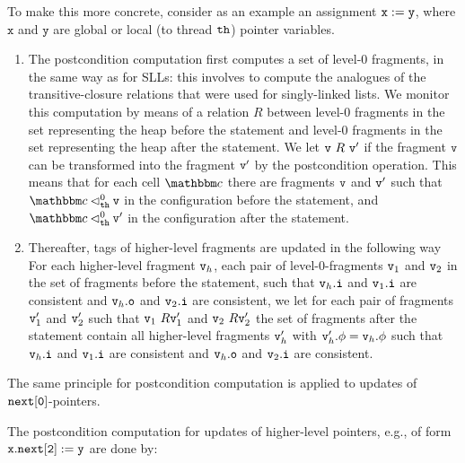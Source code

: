 To make this more concrete, consider as an example an assignment
${\tt x := y}$, where $\mathtt{x}$ and $\mathtt{y}$ are global or local
(to thread ${\tt th}$) pointer variables.
\begin{enumerate}
  \item
The postcondition computation first computes a set of level-$0$ fragments,
in the same way as for SLLs: this involves to compute
the analogues of the transitive-closure relations that were used
for singly-linked lists. We monitor this computation by means of a relation
$R$ between level-$0$ fragments  in the set representing the heap before the
statement and level-$0$ fragments in the set representing the heap after the
statement. We let $\mathtt{v} \ R \ \mathtt{v}'$ if the fragment $\mathtt{v}$ can be
transformed into the fragment $\mathtt{v}'$ by the postcondition operation.
This means that for each cell $\cell$ there are fragments $\mathtt{v}$ and $\mathtt{v}'$
such that $\cell \satslfrag{\thread}{0} \frag$ in the configuration before
the statement, and $\cell \satslfrag{\thread}{0} \frag'$ in the configuration
after the statement.
\item
  Thereafter, tags of higher-level fragments are updated in the following way
  For each higher-level fragment $\mathtt{v}_h$, each pair of
  level-$0$-fragments $\mathtt{v}_1$ and $\mathtt{v}_2$ in the set of fragments
  before the statement, such that
  $\mathtt{v}_h.\mathtt{i}$ and $\mathtt{v}_1.\mathtt{i}$ are consistent and
  $\mathtt{v}_h.\mathtt{o}$ and $\mathtt{v}_2.\mathtt{i}$ are consistent, we let for
  each pair of fragments $\mathtt{v}_1'$ and $\mathtt{v}_2'$ such that
  $\mathtt{v}_1 \ R \mathtt{v}_1'$ and $\mathtt{v}_2 \ R \mathtt{v}_2'$ the set of fragments
  after the statement contain all higher-level fragments
  $\mathtt{v}_h'$ with $\mathtt{v}_h'.\phi = \mathtt{v}_h.\phi$ such that
  $\mathtt{v}_h.\mathtt{i}$ and $\mathtt{v}_1.\mathtt{i}$ are consistent and
  $\mathtt{v}_h.\mathtt{o}$ and $\mathtt{v}_2.\mathtt{i}$ are consistent.
   
\end{enumerate}
The same principle for postcondition computation is applied to updates of
$\tt next[0]$-pointers.

The postcondition computation for updates of higher-level pointers, e.g.,
of form $\tt x.next[2] := y$ are done by:


  




%
